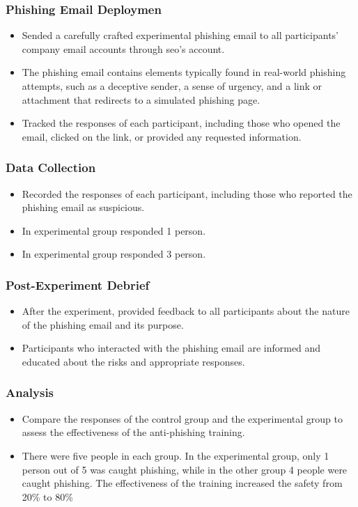 \documentclass[conference]{IEEEtran}
\begin{document}

\subsubsection{Phishing Email Deploymen}
\begin{itemize}
    \item Sended a carefully crafted experimental phishing email to all participants' company email accounts through seo’s account.
    \item The phishing email contains elements typically found in real-world phishing attempts, such as a deceptive sender, a sense of urgency, and a link or attachment that redirects to a simulated phishing page.
    \item Tracked the responses of each participant, including those who opened the email, clicked on the link, or provided any requested information.
\end{itemize}


\subsubsection{Data Collection}
\begin{itemize}
    \item Recorded the responses of each participant, including those who reported the phishing email as suspicious.
    \item In experimental group responded 1 person.
    \item In experimental group responded 3 person.
\end{itemize}

\subsubsection{Post-Experiment Debrief}
\begin{itemize}
    \item After the experiment, provided feedback to all participants about the nature of the phishing email and its purpose.
    \item Participants who interacted with the phishing email are informed and educated about the risks and appropriate responses.
\end{itemize}

\subsubsection{Analysis}
\begin{itemize}
    \item Compare the responses of the control group and the experimental group to assess the effectiveness of the anti-phishing training.
    \item There were five people in each group. In the experimental group, only 1 person out of 5 was caught phishing, while in the other group 4 people were caught phishing. The effectiveness of the training increased the safety from 20\% to 80\%
\end{itemize}
\end{document}
